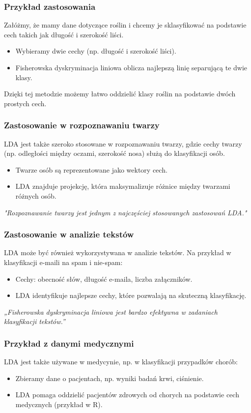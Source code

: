 \documentclass{beamer}
\begin{document}
\begin{frame}
    \frametitle{Przykład zastosowania}
    Załóżmy, że mamy dane dotyczące roślin i chcemy je sklasyfikować na podstawie cech takich jak długość i szerokość liści. 
    \begin{itemize}
        \item Wybieramy dwie cechy (np. długość i szerokość liści).
        \item Fisherowska dyskryminacja liniowa oblicza najlepszą linię separującą te dwie klasy.
    \end{itemize}
    
    Dzięki tej metodzie możemy łatwo oddzielić klasy roślin na podstawie dwóch prostych cech.
\end{frame}

\begin{frame}
    \frametitle{Zastosowanie w rozpoznawaniu twarzy}
    LDA jest także szeroko stosowane w rozpoznawaniu twarzy, gdzie cechy twarzy (np. odległości między oczami, szerokość nosa) służą do klasyfikacji osób.
    \begin{itemize}
        \item Twarze osób są reprezentowane jako wektory cech.
        \item LDA znajduje projekcję, która maksymalizuje różnice między twarzami różnych osób.
    \end{itemize}
    \textit{"Rozpoznawanie twarzy jest jednym z najczęściej stosowanych zastosowań LDA."}
\end{frame}

\begin{frame}
    \frametitle{Zastosowanie w analizie tekstów}
    LDA może być również wykorzystywana w analizie tekstów. Na przykład w klasyfikacji e-maili na spam i nie-spam:
    \begin{itemize}
        \item Cechy: obecność słów, długość e-maila, liczba załączników.
        \item LDA identyfikuje najlepsze cechy, które pozwalają na skuteczną klasyfikację.
    \end{itemize}
    \textit{„Fisherowska dyskryminacja liniowa jest bardzo efektywna w zadaniach klasyfikacji tekstów.”}
\end{frame}

\begin{frame}
    \frametitle{Przykład z danymi medycznymi}
    LDA jest także używane w medycynie, np. w klasyfikacji przypadków chorób:
    \begin{itemize}
        \item Zbieramy dane o pacjentach, np. wyniki badań krwi, ciśnienie.
        \item LDA pomaga oddzielić pacjentów zdrowych od chorych na podstawie cech medycznych (przykład w R).
    \end{itemize}
\end{frame}
\end{document}
